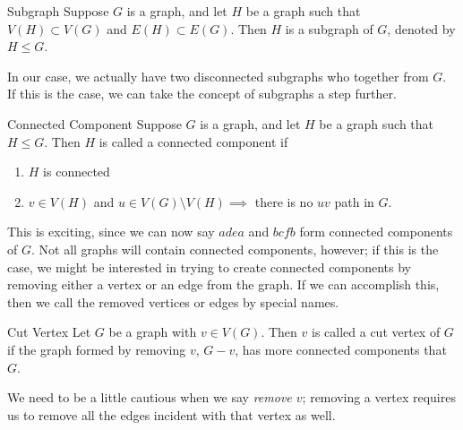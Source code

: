 \begin{definition}{Subgraph}
	Suppose $G$ is a graph, and let $H$ be a graph such that $V(H)\subset V(G)$ and $E(H)\subset E(G)$.
	Then $H$ is a subgraph of $G$, denoted by $H\leq G$.
\end{definition}

In our case, we actually have two disconnected subgraphs who together from $G$.
If this is the case, we can take the concept of subgraphs a step further.

\begin{definition}{Connected Component}
	Suppose $G$ is a graph, and let $H$ be a graph such that $H\leq G$. Then $H$ is called a connected component if
	\begin{enumerate}
		\item $H$ is connected
		\item $v\in V(H)$ and $u\in V(G)\setminus V(H) \implies$ there is no $uv$ path in $G$.
	\end{enumerate}
\end{definition}

This is exciting, since we can now say $adea$ and $bcfb$ form connected components of $G$.
Not all graphs will contain connected components, however; if this is the case, we might be interested in trying to create connected components by removing either a vertex or an edge from the graph.
If we can accomplish this, then we call the removed vertices or edges by special names.

\begin{definition}{Cut Vertex}
	Let $G$ be a graph with $v\in V(G)$. Then $v$ is called a cut vertex of $G$ if the graph formed by removing $v$, $G-v$, has more connected components that $G$.
\end{definition}

We need to be a little cautious when we say \textit{remove $v$}; removing a vertex requires us to remove all the edges incident with that vertex as well.

